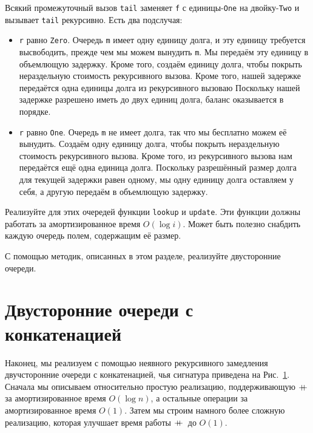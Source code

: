 \begin{theorem}
  Всякий промежуточный вызов \lstinline!tail! заменяет \lstinline!f! с
  единицы-\lstinline!One! на двойку-\lstinline!Two! и вызывает
  \lstinline!tail! рекурсивно. Есть два подслучая:
  \begin{itemize}
  \item \lstinline!r! равно \lstinline!Zero!. Очередь \lstinline!m! имеет одну
    единицу долга, и эту единицу требуется высвободить, прежде чем мы можем
    вынудить \lstinline!m!. Мы передаём эту единицу в объемлющую
    задержку. Кроме того, создаём единицу долга, чтобы покрыть
    нераздельную стоимость рекурсивного вызова.  Кроме того, нашей
    задержке передаётся одна единицы долга из рекурсивного вызоваю
    Поскольку нашей задержке разрешено иметь до двух единиц долга,
    баланс оказывается в порядке.
  \item \lstinline!r! равно \lstinline!One!. Очередь \lstinline!m! не
    имеет долга, так что мы бесплатно можем её вынудить. Создаём одну
    единицу долга, чтобы покрыть нераздельную стоимость рекурсивного
    вызова. Кроме того, из рекурсивного вызова нам передаётся ещё одна
    единица долга. Поскольку разрешённый размер долга для текущей
    задержки равен одному, мы одну единицу долга оставляем у себя, а
    другую передаём в объемлющую задержку.
  \end{itemize}
\end{theorem}

\begin{exercise}\label{ex:11.1}
  Реализуйте для этих очередей функции \lstinline!lookup! и
  \lstinline!update!. Эти функции должны работать за амортизированное
  время $O(\log i)$. Может быть полезно снабдить каждую очередь
  полем, содержащим её размер.
\end{exercise}

\begin{exercise}\label{ex:11.2}
  С помощью методик, описанных в этом разделе, реализуйте двусторонние
  очереди.
\end{exercise}

\section{Двусторонние очереди с конкатенацией}
\label{sc:11.2}

Наконец, мы реализуем с помощью неявного рекурсивного замедления
двучсторонние очереди с конкатенацией, чья сигнатура приведена на
Рис.~\ref{sc:11.2}. Сначала мы описываем относительно простую
реализацию, поддерживающую $+\!\!\!+\,$ за амортизированное время $O(\log
n)$, а остальные операции за амортизированное время $O(1)$. Затем мы
строим намного более сложную реализацию, которая улучшает время работы
$+\!\!\!+\,$ до $O(1)$.

